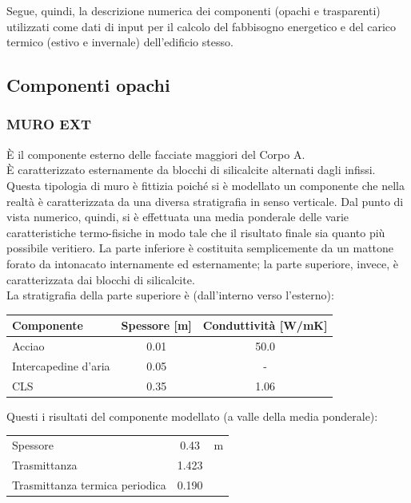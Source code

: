 Segue, quindi, la descrizione numerica dei componenti (opachi e trasparenti) utilizzati come dati di input per il calcolo del fabbisogno energetico e del carico termico (estivo e invernale) dell'edificio stesso.
\subsection{Componenti opachi}
\subsubsection{MURO EXT}
È il componente esterno delle facciate maggiori del Corpo A. \\È caratterizzato esternamente da blocchi di silicalcite alternati dagli infissi. \\Questa tipologia di muro è fittizia poiché si è modellato un componente che nella realtà è caratterizzata da una diversa stratigrafia in senso verticale. Dal punto di vista numerico, quindi, si è effettuata una media ponderale delle varie caratteristiche termo-fisiche in modo tale che il risultato finale sia quanto più possibile veritiero. La parte inferiore è costituita semplicemente da un mattone forato da  intonacato internamente ed esternamente; la parte superiore, invece, è caratterizzata dai blocchi di silicalcite. \\ La stratigrafia della parte superiore è (dall'interno verso l'esterno):
\begin{center}
	\begin{tabular}{lcc}
		\toprule
		Componente & Spessore [m] & Conduttività [\si{W/mK}] \\
		\midrule
		Acciao & \num{0.01} & \num{50.0} \\
		Intercapedine d'aria & \num{0.05} & -\\
		CLS & \num{0.35} & \num{1.06} \\
		\bottomrule
	\end{tabular}
\end{center}
Questi i risultati del componente modellato (a valle della media ponderale):
\begin{center}
	\begin{tabular}{lcc}
		\toprule
		Spessore & \num{0.43} & \si{m}\\
		Trasmittanza & \num{1.423} & \trasm\\
		Trasmittanza termica periodica & \num{0.190} & \trasm\\
		\bottomrule
	\end{tabular}
\end{center}
